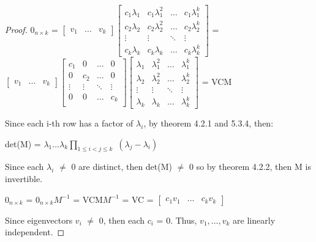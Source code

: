 \begin{proof}
        \hspace{0.5cm}
        \scriptsize
        $0_{n \times k}$ =
        $\begin{bmatrix}
            v_1 & ... & v_k
        \end{bmatrix}
        \begin{bmatrix}
            c_1 \lambda_1 & c_1 \lambda_1^2 & \hdots & c_1 \lambda_1^k \\
            c_2 \lambda_2 & c_2 \lambda_2^2 & \hdots & c_2 \lambda_2^k \\
            \vdots & \vdots & \ddots & \vdots \\
            c_k \lambda_k & c_k \lambda_k & \hdots & c_k \lambda_k^k
        \end{bmatrix}$ =
        $\begin{bmatrix}
            v_1 & ... & v_k
        \end{bmatrix}
        \begin{bmatrix}
            c_1 & 0 & \hdots & 0 \\
            0 & c_2 & \hdots & 0 \\
            \vdots & \vdots & \ddots & \vdots \\
            0 & 0 & \hdots & c_k \\
        \end{bmatrix}
        \begin{bmatrix}
            \lambda_1 & \lambda_1^2 & \hdots & \lambda_1^k \\
            \lambda_2 & \lambda_2^2 & \hdots & \lambda_2^k \\
            \vdots & \vdots & \ddots & \vdots \\
            \lambda_k & \lambda_k & \hdots & \lambda_k^k
        \end{bmatrix}$
        = VCM
        \normalsize

        Since each i-th row has a factor of $\lambda_i$, by
        {\color{red} theorem 4.2.1} and {\color{red} 5.3.4}, then:

        \hspace{0.5cm}
        det(M) = $\lambda_1...\lambda_k
                    \prod_{1 \leq i < j \leq k}$ $(\lambda_j - \lambda_i)$

        Since each $\lambda_i$ $\not =$ 0 are distinct, then det(M) $\not =$ 0
        so by {\color{red} theorem 4.2.2}, then M is invertible.

        \hspace{0.5cm}
        $0_{n \times k}$
        = $0_{n \times k}M^{-1}$
        = VCM$M^{-1}$
        = VC
        = $\begin{bmatrix}
            c_1v_1 & ... & c_kv_k
        \end{bmatrix}$

        Since eigenvectors $v_i$ $\not =$ 0, then each $c_i$ = 0.
        Thus, $v_1,...,v_k$ are linearly independent.
    \end{proof}

